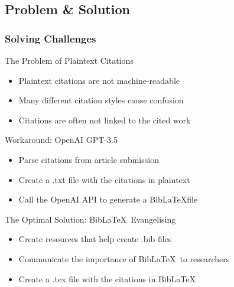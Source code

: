 \documentclass[aspectratio=169,9pt,xcolor=dvipsnames]{beamer}
\begin{document}
\subsection{Problem \& Solution}
\begin{frame}[t]
    \frametitle{Solving Challenges}
    \begin{block}{The Problem of Plaintext Citations}
        \begin{itemize}
            \item Plaintext citations are not machine-readable
            \item Many different citation styles cause confusion
            \item Citations are often not linked to the cited work
        \end{itemize}
    \end{block}
    \begin{block}{Workaround: OpenAI GPT-3.5}
        \begin{itemize}
            \item Parse citations from article submission
            \item Create a .txt file with the citations in plaintext
            \item Call the OpenAI API to generate a Bib\LaTeX file
        \end{itemize}
    \end{block}
\begin{block}{The Optimal Solution: Bib\LaTeX\ Evangelising}
    \begin{itemize}
        \item Create resources that help create .bib files
        \item Communicate the importance of Bib\LaTeX\ to researchers
        \item Create a .tex file with the citations in Bib\LaTeX
    \end{itemize}
\end{block}
\centering
\end{frame}

\end{document}
